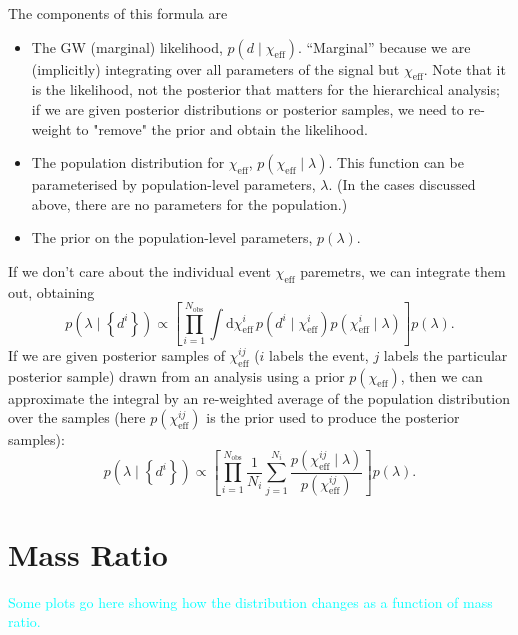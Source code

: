 \documentclass[modern,linenumbers]{aastex61}
\newcommand{\chieff}{\chi_\mathrm{eff}}
\newcommand{\dd}{\mathrm{d}}
\newcommand{\will}[1]{\textcolor{cyan}{#1}}
\begin{document}
The components of this formula are
\begin{itemize}
\item The GW (marginal) likelihood, $p\left(d \mid \chieff\right)$.
  ``Marginal'' because we are (implicitly) integrating over all
  parameters of the signal but $\chieff$.  Note that it is the
  likelihood, not the posterior that matters for the hierarchical
  analysis; if we are given posterior distributions or posterior
  samples, we need to re-weight to "remove" the prior and obtain the
  likelihood.
\item The population distribution for $\chieff$,
  $p\left( \chieff \mid \lambda \right)$.  This function can be
  parameterised by population-level parameters, $\lambda$.  (In the
  cases discussed above, there are no parameters for the population.)
\item The prior on the population-level parameters, $p(\lambda)$.
\end{itemize}
If we don't care about the individual event $\chieff$ paremetrs, we
can integrate them out, obtaining
\begin{equation}
  p\left( \lambda \mid \left\{ d^i \right\} \right) \propto \left[ \prod_{i=1}^{N_\mathrm{obs}} \int \dd \chieff^i \, p\left(d^i \mid \chieff^i \right) p\left( \chieff^i \mid \lambda \right) \right] p\left(\lambda\right).
\end{equation}
If we are given posterior samples of $\chieff^{ij}$ ($i$ labels the
event, $j$ labels the particular posterior sample) drawn from an
analysis using a prior $p\left( \chieff \right)$, then we can
approximate the integral by an re-weighted average of the population
distribution over the samples (here $p\left( \chieff^{ij} \right)$ is
the prior used to produce the posterior samples):
\begin{equation}
  p\left( \lambda \mid \left\{ d^i \right\} \right) \propto \left[ \prod_{i=1}^{N_\mathrm{obs}} \frac{1}{N_i} \sum_{j=1}^{N_i} \frac{p\left( \chieff^{ij} \mid \lambda \right)}{p\left( \chieff^{ij} \right)} \right] p\left(\lambda\right).
\end{equation}

\section{Mass Ratio}
\label{sec:mass-ratio}

\will{Some plots go here showing how the distribution changes as a
  function of mass ratio.}


\end{document}
